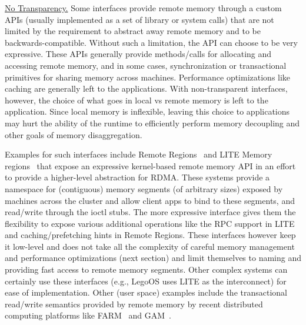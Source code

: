 \vspace{5pt}
\noindent \uline{No Transparency.}
Some interfaces provide remote memory through a custom APIs 
(usually implemented as a set of library or system calls) that 
are not limited by the requirement to abstract away remote 
memory and to be backwards-compatible. Without such a 
limitation, the API can choose to be very expressive.
These APIs generally provide methods/calls for allocating and 
accessing remote memory, and in some cases, synchronization or 
transactional primitives for sharing memory across machines. 
Performance optimizations like caching are generally left to 
the applications. With non-transparent interfaces, however,
the choice of what goes in local vs remote memory is left to 
the application. Since local memory is inflexible, leaving 
this choice to applications may hurt the ability of the 
runtime to efficiently perform memory decoupling and other 
goals of memory disaggregation.

Examples for such interfaces include Remote Regions~\cite{remregions} 
and LITE Memory regions~\cite{literdma} that expose an expressive
kernel-based remote memory API in an effort to provide a 
higher-level abstraction for RDMA.
These systems provide a namespace for (contiguous) memory 
segments (of arbitrary sizes) exposed by machines across the 
cluster and allow client apps to bind to these segments, 
and read/write through the ioctl stubs. The more expressive 
interface gives them the flexibility to expose various 
additional operations like the RPC support in LITE and 
caching/prefetching hints in Remote Regions. 
These interfaces however keep it low-level and does not take 
all the complexity of careful memory management and performance 
optimizations (next section) and limit themselves to naming 
and providing fast access to remote memory segments. Other 
complex systems can certainly use these interfaces 
(e.g., LegoOS uses LITE as the interconnect) for ease of 
implementation. Other (user space) examples include the 
transactional read/write semantics provided by
remote memory by recent distributed computing platforms like
FARM~\cite{farm} and GAM~\cite{gam}.

